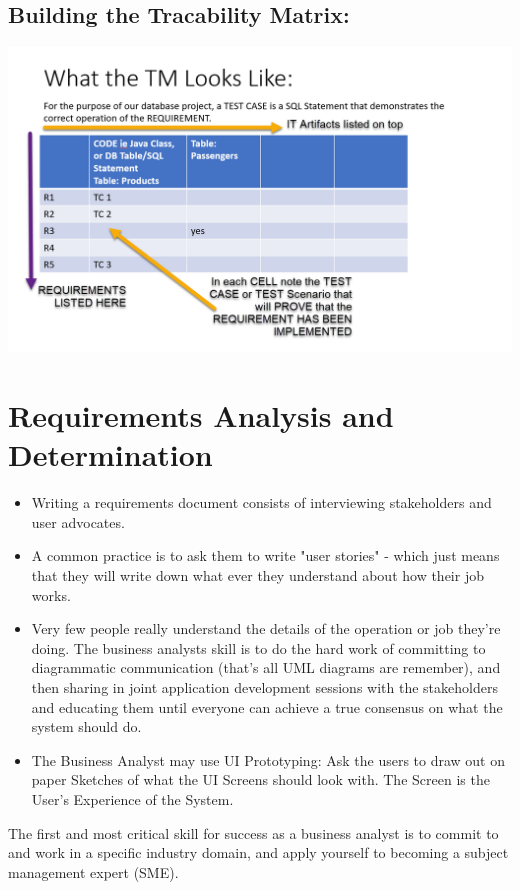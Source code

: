 \subsection{Building the Tracability Matrix:}

\includegraphics[scale=0.6]{images/TRACABILITYMATRIX.png}

\section{Requirements Analysis and Determination}

\begin{itemize}
    \item Writing a requirements document consists of interviewing stakeholders and user advocates. 
    \item A common practice is to ask them to write "user stories" - which just means that they will write down what ever they understand about how their job works.     
    \item Very few people really understand the details of the operation or job they're doing. The business analysts skill is to do the hard work of committing to diagrammatic communication (that's all UML diagrams are remember), and then sharing in joint application development sessions with the stakeholders and educating them until everyone can achieve a true consensus on what the system should do. 

    \item The Business Analyst may use UI Prototyping: Ask the users to draw out on paper Sketches of what the UI Screens should look with. The Screen is the User's Experience of the System.
    
\end{itemize}

The first and most critical skill for success as a business analyst is to commit to and work in a specific  industry domain, and apply yourself to becoming a subject management expert (SME).  
